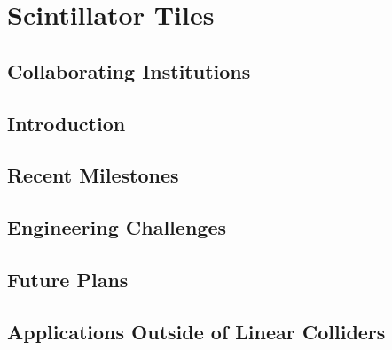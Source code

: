 \section{Scintillator Tiles}
\subsection{Collaborating Institutions}
\subsection{Introduction}
\subsection{Recent Milestones}
\subsection{Engineering Challenges}
\subsection{Future Plans}
\subsection{Applications Outside of Linear Colliders}
